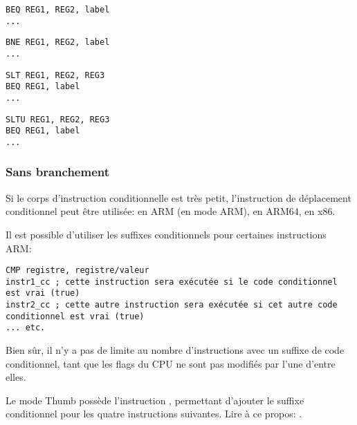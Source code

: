 \begin{lstlisting}[caption=Check si les valeurs sont égales (Branch if EQual),style=customasmMIPS]
BEQ REG1, REG2, label
...
\end{lstlisting}

\begin{lstlisting}[caption=Check si les valeurs ne sont pas égales (Branch if Not Equal),style=customasmMIPS]
BNE REG1, REG2, label
...
\end{lstlisting}

\begin{lstlisting}[caption=Check REG2 plus petit que REG3 (signé),style=customasmMIPS]
SLT REG1, REG2, REG3
BEQ REG1, label
...
\end{lstlisting}

\begin{lstlisting}[caption=Check REG2 plus petit que REG3 (non signé),style=customasmMIPS]
SLTU REG1, REG2, REG3
BEQ REG1, label
...
\end{lstlisting}

\subsubsection{Sans branchement}

Si le corps d'instruction conditionnelle est très petit, l'instruction de déplacement
conditionnel peut être utilisée:
 en ARM (en mode ARM),  en ARM64,  en x86.


Il est possible d'utiliser les suffixes conditionnels pour certaines instructions
ARM:

\begin{lstlisting}[caption=ARM (\ARMMode),style=customasmARM]
CMP registre, registre/valeur
instr1_cc ; cette instruction sera exécutée si le code conditionnel est vrai (true)
instr2_cc ; cette autre instruction sera exécutée si cet autre code conditionnel est vrai (true)
... etc.
\end{lstlisting}

Bien sûr, il n'y a pas de limite au nombre d'instructions avec un suffixe de code
conditionnel, tant que les flags du CPU ne sont pas modifiés par l'une d'entre elles.


Le mode Thumb possède l'instruction , permettant d'ajouter le suffixe conditionnel
pour les quatre instructions suivantes.
Lire à ce propos: .

